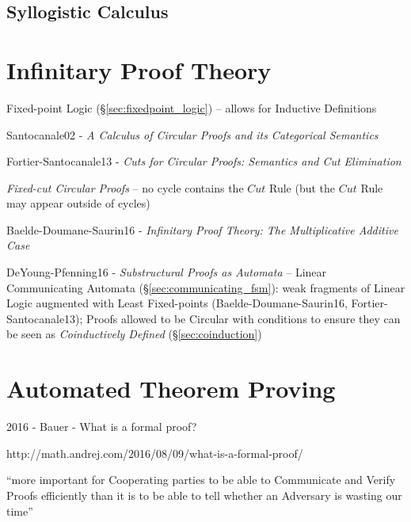 \subsection{Syllogistic Calculus} \label{sec:syllogistic_calculus}



\section{Infinitary Proof Theory}\label{sec:infinitary_proof_theory}

\fist Fixed-point Logic (\S\ref{sec:fixedpoint_logic}) -- allows for
Inductive Definitions

Santocanale02 - \emph{A Calculus of Circular Proofs and its
  Categorical Semantics}

Fortier-Santocanale13 - \emph{Cuts for Circular Proofs: Semantics and
  Cut Elimination}

\emph{Fixed-cut Circular Proofs} -- no cycle contains the $Cut$ Rule
(but the $Cut$ Rule may appear outside of cycles)

Baelde-Doumane-Saurin16 - \emph{Infinitary Proof Theory: The
  Multiplicative Additive Case}

DeYoung-Pfenning16 - \emph{Substructural Proofs as Automata} -- Linear
Communicating Automata (\S\ref{sec:communicating_fsm}): weak
fragments of Linear Logic augmented with Least Fixed-points
(Baelde-Doumane-Saurin16, Fortier-Santocanale13); Proofs allowed to be
Circular with conditions to ensure they can be seen as
\emph{Coinductively Defined} (\S\ref{sec:coinduction})



\section{Automated Theorem Proving}\label{sec:atp}

2016 - Bauer - What is a formal proof?

http://math.andrej.com/2016/08/09/what-is-a-formal-proof/

``more important for Cooperating parties to be able to Communicate and
Verify Proofs efficiently than it is to be able to tell whether an
Adversary is wasting our time''

